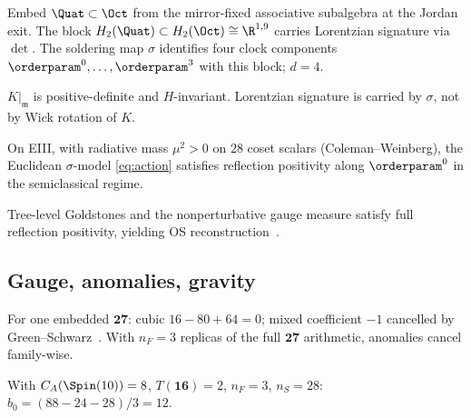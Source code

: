 \begin{definition}[Soldering]\label{def:soldering}
Embed $\Quat\subset\Oct$ from the mirror-fixed associative subalgebra at the
Jordan exit. The block $H_2(\Quat)\subset H_2(\Oct)\cong\R^{1,9}$ carries
Lorentzian signature via $\det$. The soldering map $\sigma$ identifies four
clock components $\orderparam^0,\ldots,\orderparam^3$ with this block;
$d=4$.
\end{definition}

\begin{proposition}\label{prop:coset-metric}
$K|_{\mathfrak{m}}$ is positive-definite and $H$-invariant. Lorentzian
signature is carried by $\sigma$, not by Wick rotation of $K$.
\end{proposition}

\begin{theorem}\label{thm:rp}
On EIII, with radiative mass $\mu^2>0$ on $28$ coset scalars
(Coleman--Weinberg), the Euclidean $\sigma$-model \eqref{eq:action} satisfies
reflection positivity along $\orderparam^0$ in the semiclassical regime.
\end{theorem}

\begin{conjecture}\label{conj:rp}
Tree-level Goldstones and the nonperturbative gauge measure satisfy full
reflection positivity, yielding OS reconstruction~\cite{OsterwalderSchrader1973}.
\end{conjecture}

\subsection{Gauge, anomalies, gravity}
\label{sec:physics:gauge}

\begin{theorem}\label{thm:anomaly}
For one embedded $\mathbf{27}$: cubic $16-80+64=0$; mixed coefficient $-1$
cancelled by Green--Schwarz~\cite{GreenSchwarz1984}. With $n_F=3$ replicas of
the full $\mathbf{27}$ arithmetic, anomalies cancel family-wise.
\end{theorem}

\begin{theorem}[$b_0=12$]\label{thm:beta}
With $C_A(\Spin(10))=8$, $T(\mathbf{16})=2$, $n_F=3$, $n_S=28$:
$b_0=(88-24-28)/3=12$.
\end{theorem}

